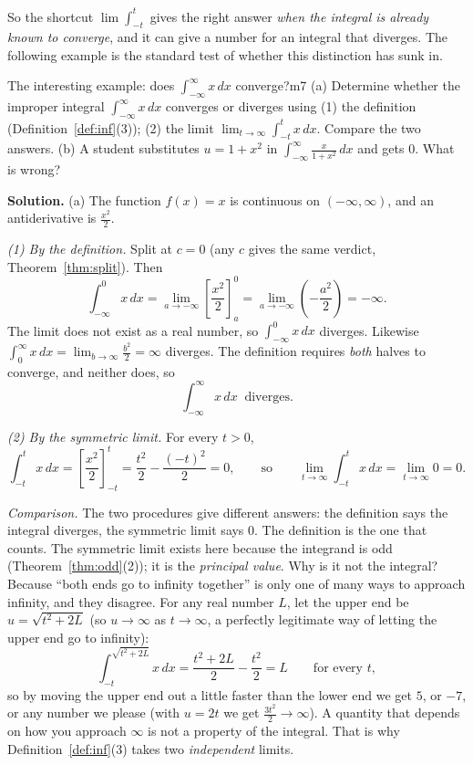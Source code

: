 \documentclass[11pt]{article}
\begin{document}
So the shortcut $\lim\int_{-t}^t$ gives the right answer \emph{when the integral is already known to converge}, and it can give a number for an integral that diverges. The following example is the standard test of whether this distinction has sunk in.

\begin{exmp}{The interesting example: does $\int_{-\infty}^\infty x\,dx$ converge?}{m7}
(a) Determine whether the improper integral $\displaystyle\int_{-\infty}^\infty x\,dx$ converges or diverges using (1) the definition (Definition~\ref{def:inf}(3)); (2) the limit $\displaystyle\lim_{t\to\infty}\int_{-t}^tx\,dx$. Compare the two answers. (b) A student substitutes $u=1+x^2$ in $\displaystyle\int_{-\infty}^\infty\frac{x}{1+x^2}\,dx$ and gets $0$. What is wrong?

\textbf{Solution.} (a) The function $f(x)=x$ is continuous on $(-\infty,\infty)$, and an antiderivative is $\frac{x^2}2$.

\emph{(1) By the definition.} Split at $c=0$ (any $c$ gives the same verdict, Theorem~\ref{thm:split}). Then
\[\int_{-\infty}^0x\,dx=\lim_{a\to-\infty}\left[\frac{x^2}2\right]_a^0=\lim_{a\to-\infty}\left(-\frac{a^2}2\right)=-\infty .\]
The limit does not exist as a real number, so $\int_{-\infty}^0x\,dx$ diverges. Likewise $\int_0^\infty x\,dx=\lim_{b\to\infty}\frac{b^2}2=\infty$ diverges. The definition requires \emph{both} halves to converge, and neither does, so
\[\int_{-\infty}^\infty x\,dx\ \text{ diverges.}\]

\emph{(2) By the symmetric limit.} For every $t>0$,
\[\int_{-t}^tx\,dx=\left[\frac{x^2}2\right]_{-t}^t=\frac{t^2}2-\frac{(-t)^2}2=0,\qquad\text{so}\qquad\lim_{t\to\infty}\int_{-t}^tx\,dx=\lim_{t\to\infty}0=0 .\]

\emph{Comparison.} The two procedures give different answers: the definition says the integral diverges, the symmetric limit says $0$. The definition is the one that counts. The symmetric limit exists here because the integrand is odd (Theorem~\ref{thm:odd}(2)); it is the \emph{principal value}. Why is it not the integral? Because ``both ends go to infinity together'' is only one of many ways to approach infinity, and they disagree. For any real number $L$, let the upper end be $u=\sqrt{t^2+2L}$ (so $u\to\infty$ as $t\to\infty$, a perfectly legitimate way of letting the upper end go to infinity):
\[\int_{-t}^{\sqrt{t^2+2L}}x\,dx=\frac{t^2+2L}2-\frac{t^2}2=L\qquad\text{for every }t,\]
so by moving the upper end out a little faster than the lower end we get $5$, or $-7$, or any number we please (with $u=2t$ we get $\frac{3t^2}2\to\infty$). A quantity that depends on how you approach $\infty$ is not a property of the integral. That is why Definition~\ref{def:inf}(3) takes two \emph{independent} limits.


\end{exmp}
\end{document}
